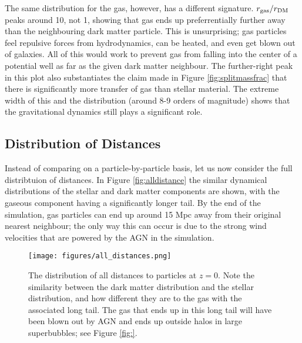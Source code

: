 The same distribution for the gas, however, has a different signature. $r_{\rm gas}/r_{\rm DM}$ peaks around 10, not 1, showing that gas ends up preferrentially further away than the neighbouring dark matter particle. This is unsurprising; gas particles feel repulsive forces from hydrodynamics, can be heated, and even get blown out of galaxies. All of this would work to prevent gas from falling into the center of a potential well as far as the given dark matter neighbour. The further-right peak in this plot also substantiates the claim made in Figure \ref{fig:splitmassfrac} that there is significantly more transfer of gas than stellar material. The extreme width of this and the distribution (around 8-9 orders of magnitude) shows that the gravitational dynamics still plays a significant role.

\subsection{Distribution of Distances}

Instead of comparing on a particle-by-particle basis, let us now consider the full distribtuion of distances. In Figure \ref{fig:alldistance} the similar dynamical distributions of the stellar and dark matter components are shown, with the gaseous component having a significantly longer tail. By the end of the simulation, gas particles can end up around 15 Mpc away from their original nearest neighbour; the only way this can occur is due to the strong wind velocities that are powered by the AGN in the simulation.

\begin{figure}
    \centering
    \texttt{[image: figures/all\_distances.png]}
    \caption{The distribution of all distances to particles at $z=0$. Note the similarity between the dark matter distribution and the stellar distribution, and how different they are to the gas with the associated long tail. The gas that ends up in this long tail will have been blown out by AGN and ends up outside halos in large superbubbles; see Figure \ref{fig:}.}
    \label{fig:alldistances}
\end{figure}


